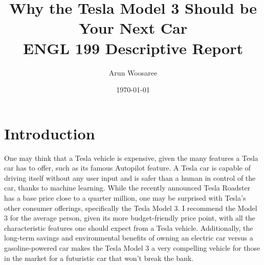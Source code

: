 \documentclass{article}
\title{Why the Tesla Model 3 Should be Your Next Car\\
\vspace{.25cm}\large ENGL 199 Descriptive Report \vspace{-.5cm}}
\author{\LARGE Arun Woosaree}
\date{\today}
\begin{document}
  \maketitle %

  \section{Introduction}

  One may think that a Tesla vehicle is expensive, given the many
  features a Tesla car has to offer, such as its famous Autopilot feature. A Tesla car
  is capable of driving itself without any user input and is safer than a human
  in control of the car, thanks to machine learning.\cite{safer} While the recently announced
  Tesla Roadster has a base price close to a quarter million\cite{teslaroadster}, one may be
  surprised with Tesla's other consumer offerings, specifically the Tesla Model 3.
  I recommend the Model 3 for the average person, given its more budget-friendly
  price point, with all the characteristic features one should expect from a Tesla
  vehicle. Additionally, the long-term savings and environmental benefits of owning
  an electric car versus a gasoline-powered car makes the Tesla Model 3 a very compelling
  vehicle for those in the market for a futuristic car that won't break the bank.
\end{document}
